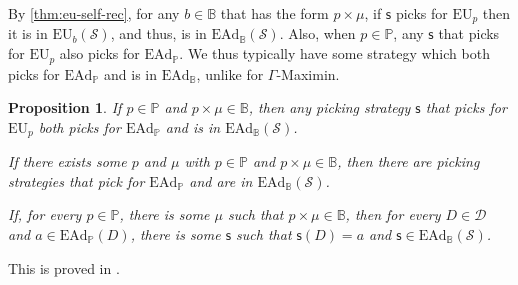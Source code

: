 \documentclass[a4paper]{article}
\newtheorem{proposition}[theorem]{Proposition}
\renewcommand\P{\mathbb{P}} %
\newcommand\EU{\mathrm{EU}}
\newcommand\EAd{\mathrm{EAd}}
\newcommand{\D}{\mathcal{D}}
\newcommand{\Decs}{\mathcal{D}}
\renewcommand\S{\mathcal{S}}
\newcommand\s{\mathsf{s}}
\newcommand{\IB}{\mathbb{B}}
\newcommand{\IP}{\P}
\renewcommand{\color}[1]{}
\newenvironment{colored}[1]{\leavevmode\color{#1}}{}
\newcommand{\Strategies}{\S}
\newenvironment{CCM rewritten}
{\begingroup\color{blue}} %
{\endgroup}              %
\begin{document}
By \cref{thm:eu-self-rec}, for any $b\in\IB$ that has the form $p\times\mu$, if $\s$ picks for $\EU_p$ then it is in $\EU_{b}(\S)$, and thus, is in $\EAd_\IB(\S)$. Also, when $p\in\IP$, any $\s$ that picks for $\EU_p$ also picks for $\EAd_\IP$. We thus typically have some strategy which both picks for $\EAd_\IP$ and is in $\EAd_\IB$, unlike for $\Gamma$-Maximin. 
 \begin{proposition}\label{thm:ead-existence[indep]}
	If $p\in\IP$ and $p\times\mu\in\IB$, then any picking strategy $\s$ that picks for $\EU_p$ both picks for $\EAd_\IP$ and is in $\EAd_\IB(\S)$. 
	
	If there exists some $p$ and $\mu$ with $p\in\IP$ and $p\times\mu\in\IB$, then there are picking strategies that pick for $\EAd_\IP$ and are in $\EAd_\IB(\S)$. 
	
	If, for every $p\in\IP$, there is some $\mu$ such that $p\times\mu\in\IB$, then for every $D\in\Decs$ and $a\in\EAd_\IP(D)$, there is some $\s$ such that $\s(D)=a$ and $\s\in\EAd_\IB(\S)$. 
\end{proposition}

This is proved in .

	

 		
 
\end{document}
